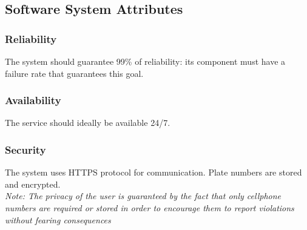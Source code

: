 \subsection{Software System Attributes}

\subsubsection{Reliability}

The system should guarantee 99\% of reliability: its component must have a failure rate that guarantees this goal.

\subsubsection{Availability}

The service should ideally be available 24/7.

\subsubsection{Security}

The system uses HTTPS protocol for communication. Plate numbers are stored and encrypted.\\
\textit{Note: The privacy of the user is guaranteed by the fact that only cellphone numbers are required or stored in order to encourage them to report violations without fearing consequences}